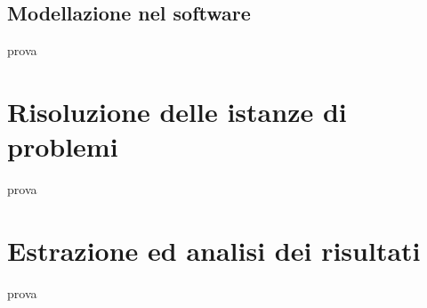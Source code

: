 \subsection{Modellazione nel software}
prova





\section{Risoluzione delle istanze di problemi}
prova





\section{Estrazione ed analisi dei risultati}
prova